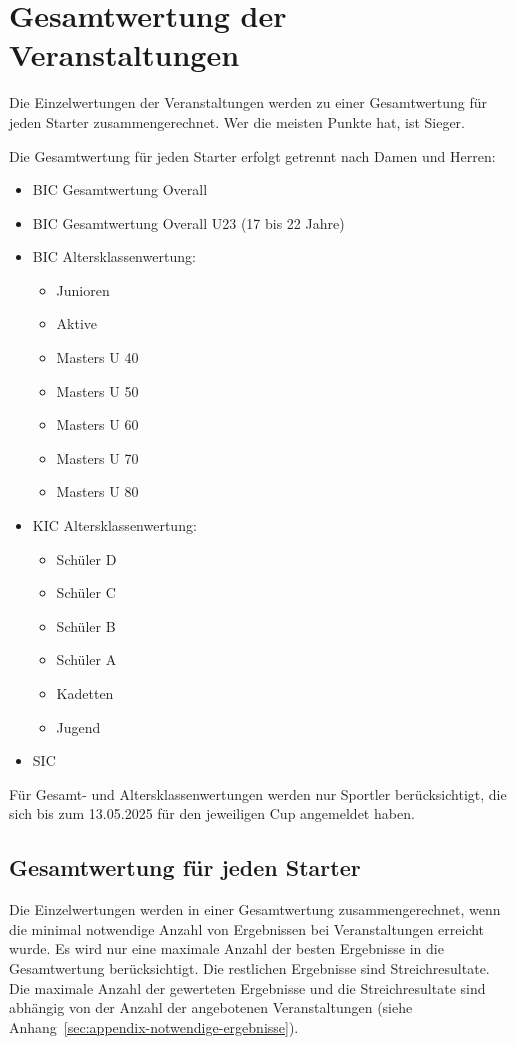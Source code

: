 \section{Gesamtwertung der Veranstaltungen}
Die Einzelwertungen der Veranstaltungen werden zu einer Gesamtwertung für jeden Starter zusammengerechnet. Wer die meisten Punkte hat, ist Sieger.

Die Gesamtwertung für jeden Starter erfolgt getrennt nach Damen und Herren:
\begin{itemize}
	\item BIC Gesamtwertung Overall
	\item BIC Gesamtwertung Overall U23 (17 bis 22 Jahre)
	\item BIC Altersklassenwertung:
	\begin{itemize}
		\item Junioren
		\item Aktive
		\item Masters U 40
		\item Masters U 50
		\item Masters U 60
		\item Masters U 70
		\item Masters U 80
	\end{itemize}
	\item KIC Altersklassenwertung:
	\begin{itemize}
		\item Schüler D
		\item Schüler C
		\item Schüler B
		\item Schüler A
		\item Kadetten
		\item Jugend
	\end{itemize}
	\item SIC
\end{itemize}

Für Gesamt- und Altersklassenwertungen werden nur Sportler berücksichtigt, die sich bis zum 13.05.2025 für den jeweiligen Cup angemeldet haben.

\subsection{Gesamtwertung für jeden Starter}

Die Einzelwertungen werden in einer Gesamtwertung zusammengerechnet, wenn die minimal notwendige Anzahl von Ergebnissen bei Veranstaltungen erreicht wurde. Es wird nur eine maximale Anzahl der besten Ergebnisse in die Gesamtwertung berücksichtigt. Die restlichen Ergebnisse sind Streichresultate. Die maximale Anzahl der gewerteten Ergebnisse und die Streichresultate sind abhängig von der Anzahl der angebotenen Veranstaltungen (siehe Anhang~\ref{sec:appendix-notwendige-ergebnisse}).

